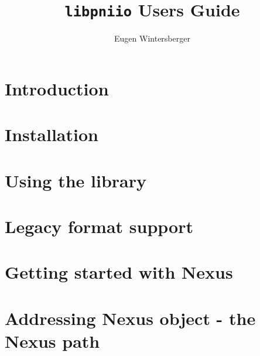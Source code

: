\documentclass[a4paper,draft]{scrbook}
\title{{\Huge{\tt libpniio} Users Guide}}
\author{Eugen Wintersberger}
\begin{document}
\maketitle
\tableofcontents
\listoftodos

\chapter{Introduction}\label{chapter:introduction}

\FloatBarrier

\chapter{Installation}\label{chapter:installation}

\FloatBarrier

\chapter{Using the library}\label{chapter:usage}

\FloatBarrier

\chapter{Legacy format support}\label{chapter:legacy_formats}
\FloatBarrier

\chapter{Getting started with Nexus}\label{chapter:nexus_quickstart}

\FloatBarrier

\chapter{Addressing Nexus object - the Nexus path}

\FloatBarrier
\end{document}

